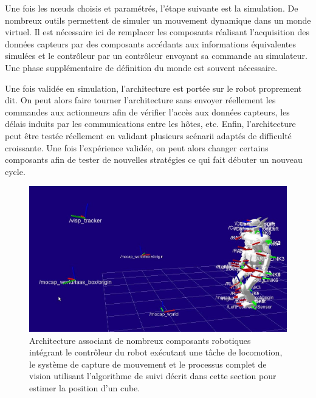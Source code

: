Une fois les n\oe uds choisis et paramétrés, l'étape suivante est la
simulation. De nombreux outils permettent de simuler un mouvement
dynamique dans un monde virtuel. Il est nécessaire ici de remplacer
les composants réalisant l'acquisition des données capteurs par des
composants accédants aux informations équivalentes simulées et le
contrôleur par un contrôleur envoyant sa commande au simulateur. Une
phase supplémentaire de définition du monde est souvent nécessaire.




Une fois validée en simulation, l'architecture est portée sur le robot
proprement dit. On peut alors faire tourner l'architecture sans
envoyer réellement les commandes aux actionneurs afin de vérifier
l'accès aux données capteurs, les délais induits par les
communications entre les hôtes, etc. Enfin, l'architecture peut être
testée réellement en validant plusieurs scénarii adaptés de difficulté
croissante. Une fois l'expérience validée, on peut alors changer
certains composants afin de tester de nouvelles stratégies ce qui fait
débuter un nouveau cycle.


\begin{figure}
  \begin{center}
    \includegraphics[width=.95\linewidth]{src/chap4-integration/rviz-full.jpg}
  \end{center}
  \caption{Architecture associant de nombreux composants
    robotiques intégrant le contrôleur du robot exécutant une tâche de
    locomotion, le système de capture de mouvement et le processus
    complet de vision utilisant l'algorithme de suivi décrit dans
    cette section pour estimer la position d'un cube.}
\end{figure}



